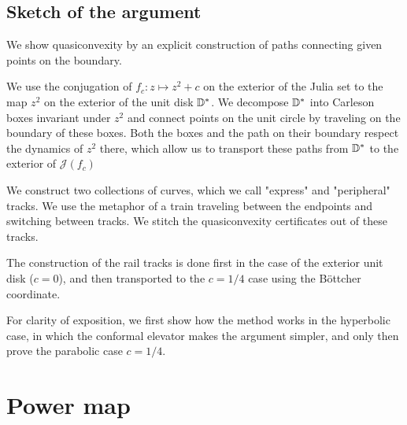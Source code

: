 \subsection{Sketch of the argument}

We show quasiconvexity by an explicit construction of paths connecting
given points on the boundary.\textbf{}

We use the conjugation of $f_{c}:z\mapsto z^{2}+c$ on the exterior
of the Julia set to the map $z^{2}$ on the exterior of the unit disk
$\mathbb{D}^{*}$. We decompose $\mathbb{D}^{*}$ into Carleson boxes invariant under
$z^{2}$ and connect points on the unit circle by traveling on the
boundary of these boxes. Both the boxes and the path on their boundary
respect the dynamics of $z^{2}$ there, which allow us to transport
these paths from $\mathbb{D}^{*}$ to the exterior of $\mathcal{J}(f_{c})$ 

We construct two collections of curves, which we call "express"
and "peripheral" tracks. We use the metaphor
of a train traveling between the endpoints and switching between tracks.
We stitch the quasiconvexity certificates out of these tracks.

The construction of the rail tracks is done first in the case of
the exterior unit disk ($c=0$), and then transported to the 
$c=1/4$ case using the Böttcher coordinate. 

For clarity of exposition, we first show how the method works in the hyperbolic case, in which the conformal elevator makes the argument
simpler, and only then prove the parabolic case $c=1/4$. 


\section{Power map}


